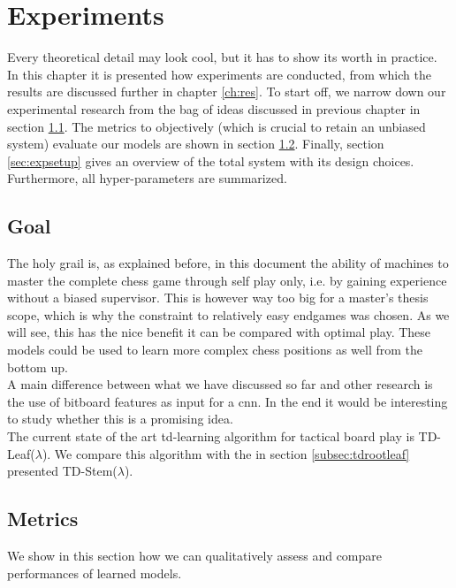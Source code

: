 \chapter{Experiments}
\label{ch:experiments}

Every theoretical detail may look cool, but it has to show its worth in practice. In this chapter it is presented how experiments are conducted, from which the results are discussed further in chapter \ref{ch:res}. To start off, we narrow down our experimental research from the bag of ideas discussed in previous chapter in section \ref{sec:goal}. The metrics to objectively (which is crucial to retain an unbiased system) evaluate our models are shown in section \ref{sec:metrics}. Finally, section \ref{sec:expsetup} gives an overview of the total system with its design choices. Furthermore, all hyper-parameters are summarized. 

\section{Goal}
\label{sec:goal}
The holy grail is, as explained before, in this document the ability of machines to master the complete chess game through self play only, i.e. by gaining experience without a biased supervisor. This is however way too big for a master's thesis scope, which is why the constraint to relatively easy endgames was chosen. As we will see, this has the nice benefit it can be compared with optimal play. These models could be used to learn more complex chess positions as well from the bottom up.\\

A main difference between what we have discussed so far and other research is the use of bitboard features as input for a \gls{cnn}. In the end it would be interesting to study whether this is a promising idea.\\

The current state of the art \gls{td}-learning  algorithm for tactical board play is TD-Leaf($\lambda$). We compare this algorithm with the in section \ref{subsec:tdrootleaf} presented TD-Stem($\lambda$).

\section{Metrics}
\label{sec:metrics}
We show in this section how we can qualitatively assess and compare performances of learned models.

